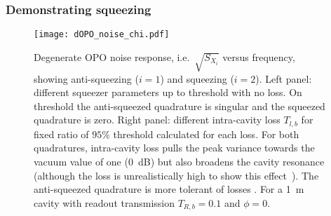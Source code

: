 

\subsubsection{Demonstrating squeezing}

\begin{figure}
	\centering
	\texttt{[image: dOPO\_noise\_chi.pdf]}
	\caption{ Degenerate OPO noise response, i.e.\ $\sqrt{S_{X_i}}$ versus frequency, showing anti-squeezing ($i=1$) and squeezing ($i=2$). Left panel: different squeezer parameters up to threshold with no loss. On threshold the anti-squeezed quadrature is singular and the squeezed quadrature is zero. Right panel: different intra-cavity loss $T_{l,b}$ for fixed ratio of $95\%$ threshold calculated for each loss. For both quadratures, intra-cavity loss pulls the peak variance towards the vacuum value of one (0~dB) but also broadens the cavity resonance (although the loss is unrealistically high to show this effect~\cite{}). The anti-squeezed quadrature is more tolerant of losses . For a 1~m cavity with readout transmission $T_{R,b}=0.1$ and $\phi=0$.}
	\label{fig:dOPO_variances}
\end{figure}

